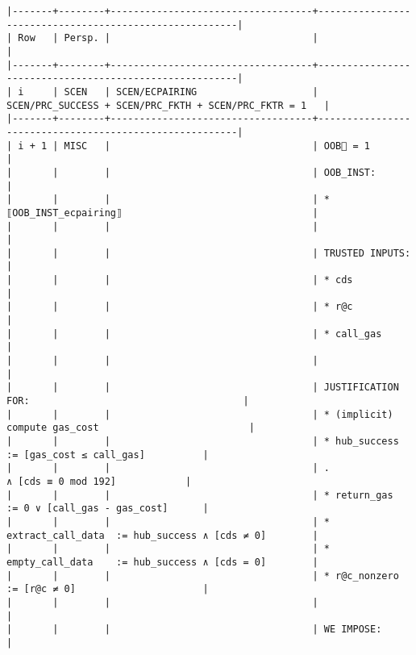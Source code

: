 \documentclass[varwidth=\maxdimen,margin=0.5cm,multi={verbatim}]{standalone}
\begin{document}
\begin{verbatim}
|-------+--------+-----------------------------------+--------------------------------------------------------|
| Row   | Persp. |                                   |                                                        |
|-------+--------+-----------------------------------+--------------------------------------------------------|
| i     | SCEN   | SCEN/ECPAIRING                    | SCEN/PRC_SUCCESS + SCEN/PRC_FKTH + SCEN/PRC_FKTR = 1   |
|-------+--------+-----------------------------------+--------------------------------------------------------|
| i + 1 | MISC   |                                   | OOB🏴 = 1                                              |
|       |        |                                   | OOB_INST:                                              |
|       |        |                                   | * ⟦OOB_INST_ecpairing⟧                                 |
|       |        |                                   |                                                        |
|       |        |                                   | TRUSTED INPUTS:                                        |
|       |        |                                   | * cds                                                  |
|       |        |                                   | * r@c                                                  |
|       |        |                                   | * call_gas                                             |
|       |        |                                   |                                                        |
|       |        |                                   | JUSTIFICATION FOR:                                     |
|       |        |                                   | * (implicit) compute gas_cost                          |
|       |        |                                   | * hub_success        := [gas_cost ≤ call_gas]          |
|       |        |                                   | .                       ∧ [cds ≡ 0 mod 192]            |
|       |        |                                   | * return_gas         := 0 ∨ [call_gas - gas_cost]      |
|       |        |                                   | * extract_call_data  := hub_success ∧ [cds ≠ 0]        |
|       |        |                                   | * empty_call_data    := hub_success ∧ [cds = 0]        |
|       |        |                                   | * r@c_nonzero        := [r@c ≠ 0]                      |
|       |        |                                   |                                                        |
|       |        |                                   | WE IMPOSE:                                             |

\end{verbatim}
\end{document}
